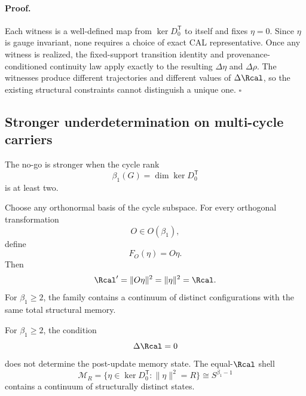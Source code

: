 \paragraph*{Proof.}
Each witness is a well-defined map from $\ker D_0^{\mathsf T}$ to itself and fixes $\eta=0$. Since $\eta$ is gauge invariant, none requires a choice of exact CAL representative. Once any witness is realized, the fixed-support transition identity and provenance-conditioned continuity law apply exactly to the resulting $\Delta\eta$ and $\Delta\rho$. The witnesses produce different trajectories and different values of $\Delta\Rcal$, so the existing structural constraints cannot distinguish a unique one. \hfill$\square$

\subsection{Stronger underdetermination on multi-cycle carriers}

The no-go is stronger when the cycle rank
\begin{equation}
\beta_1(G)=\dim\ker D_0^{\mathsf T}
\end{equation}
is at least two.

Choose any orthonormal basis of the cycle subspace. For every orthogonal transformation
\begin{equation}
O\in O(\beta_1),
\end{equation}
define
\begin{equation}
F_O(\eta)=O\eta.
\label{eq:orthogonal-family}
\end{equation}
Then
\begin{equation}
\Rcal' = \|O\eta\|^2=\|\eta\|^2=\Rcal.
\label{eq:orthogonal-R}
\end{equation}
For $\beta_1\ge2$, the family contains a continuum of distinct configurations with the same total structural memory.

\begin{corollary}
\label{cor:R-not-generator}
For $\beta_1\ge2$, the condition
\begin{equation}
\Delta\Rcal=0
\end{equation}
does not determine the post-update memory state. The equal-$\Rcal$ shell
\begin{equation}
\mathcal M_R
=
\{\eta\in\ker D_0^{\mathsf T}:\|\eta\|^2=R\}
\cong S^{\beta_1-1}
\end{equation}
contains a continuum of structurally distinct states.
\end{corollary}

